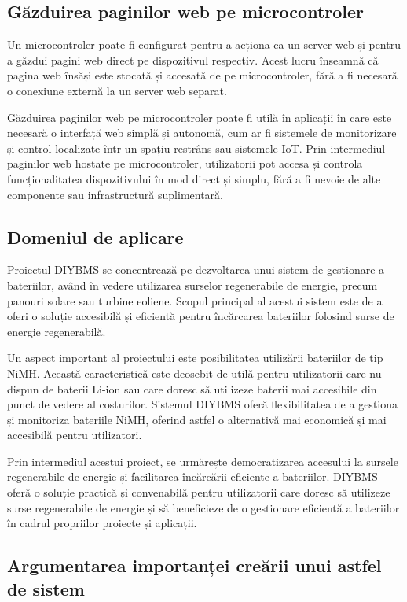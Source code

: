 \subsection{Găzduirea paginilor web pe microcontroler}

Un microcontroler poate fi configurat pentru a acționa ca un server web și pentru a găzdui pagini web direct pe dispozitivul respectiv. Acest lucru înseamnă că pagina web însăși este stocată și accesată de pe microcontroler, fără a fi necesară o conexiune externă la un server web separat.

Găzduirea paginilor web pe microcontroler poate fi utilă în aplicații în care este necesară o interfață web simplă și autonomă, cum ar fi sistemele de monitorizare și control localizate într-un spațiu restrâns sau sistemele IoT. Prin intermediul paginilor web hostate pe microcontroler, utilizatorii pot accesa și controla funcționalitatea dispozitivului în mod direct și simplu, fără a fi nevoie de alte componente sau infrastructură suplimentară.

\subsection{Domeniul de aplicare}

Proiectul DIYBMS se concentrează pe dezvoltarea unui sistem de gestionare a bateriilor, având în vedere utilizarea surselor regenerabile de energie, precum panouri solare sau turbine eoliene. Scopul principal al acestui sistem este de a oferi o soluție accesibilă și eficientă pentru încărcarea bateriilor folosind surse de energie regenerabilă.

Un aspect important al proiectului este posibilitatea utilizării bateriilor de tip NiMH. Această caracteristică este deosebit de utilă pentru utilizatorii care nu dispun de baterii Li-ion sau care doresc să utilizeze baterii mai accesibile din punct de vedere al costurilor. Sistemul DIYBMS oferă flexibilitatea de a gestiona și monitoriza bateriile NiMH, oferind astfel o alternativă mai economică și mai accesibilă pentru utilizatori.

Prin intermediul acestui proiect, se urmărește democratizarea accesului la sursele regenerabile de energie și facilitarea încărcării eficiente a bateriilor. DIYBMS oferă o soluție practică și convenabilă pentru utilizatorii care doresc să utilizeze surse regenerabile de energie și să beneficieze de o gestionare eficientă a bateriilor în cadrul propriilor proiecte și aplicații.

\subsection{Argumentarea importanței creării unui astfel de sistem}

